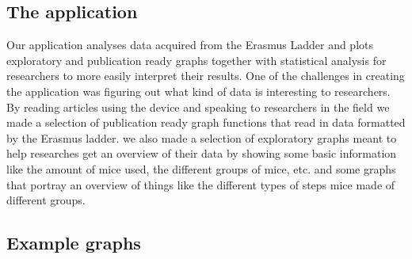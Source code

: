 \documentclass[11pt,a4paper,]{awesome-cv}
\begin{document}
\hypertarget{the-application}{%
\subsection{The application}\label{the-application}}

Our application analyses data acquired from the Erasmus Ladder and plots
exploratory and publication ready graphs together with statistical
analysis for researchers to more easily interpret their results. One of
the challenges in creating the application was figuring out what kind of
data is interesting to researchers. By reading articles using the device
and speaking to researchers in the field we made a selection of
publication ready graph functions that read in data formatted by the
Erasmus ladder. we also made a selection of exploratory graphs meant to
help researches get an overview of their data by showing some basic
information like the amount of mice used, the different groups of mice,
etc. and some graphs that portray an overview of things like the
different types of steps mice made of different groups.

\hypertarget{example-graphs}{%
\subsection{Example graphs}\label{example-graphs}}
\end{document}
